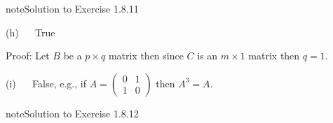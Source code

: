 \documentclass[letterpaper,10pt,english]{jupyterBook}
\begin{document}
\begin{sphinxadmonition}{note}{Solution to Exercise 1.8.11}
\begin{itemize}
\end{itemize}

\sphinxAtStartPar
(h)   True

\sphinxAtStartPar
Proof: Let \(B\) be a \(p \times q\) matrix then since \(C\) is an \(m \times 1\) matrix then \(q = 1\).

\sphinxAtStartPar
(i)   False, e.g., if \(A = \begin{pmatrix} 0 & 1 \\ 1 & 0 \end{pmatrix}\) then \(A^3 = A\).
\end{sphinxadmonition}
 \label{_pages/A1_Matrices_exercises_solutions:_pages/A1_Matrices_exercises_solutions-solution-11}

\begin{sphinxadmonition}{note}{Solution to Exercise 1.8.12}




\end{sphinxadmonition}
\end{document}
